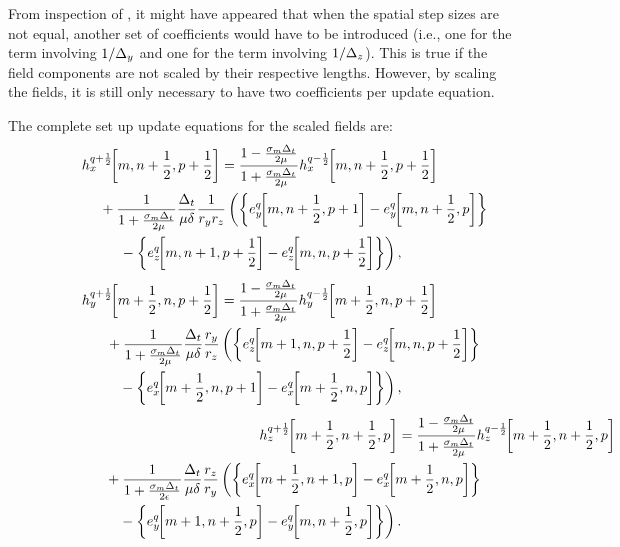 From inspection of , it might have appeared
that when the spatial step sizes are not equal, another set of
coefficients would have to be introduced (i.e., one for the term
involving $1/\Delta_y$ and one for the term involving $1/\Delta_z$).  This
is true if the field components are not scaled by their respective
lengths.  However, by scaling the fields, it is still only necessary
to have two coefficients per update equation.

The complete set up update equations for the scaled fields are:
\begin{multline}
  \fdtdh{h_x}{m,n+\half,p+\half}{q+\half} =
  \frac{1-\frac{\sigma_m\Delt}{2\mu}}{1+\frac{\sigma_m\Delt}{2\mu}}
  \fdtdh{h_x}{m,n+\half,p+\half}{q-\half} \\
  \hspace{.68in}\mbox{} +
  \frac{1}{1+\frac{\sigma_m\Delt}{2\mu}}
  \frac{\Delt}{\mu\delta}\frac{1}{r_y r_z}
  \left(
    \left\{
      \fdtdh{e_y}{m,n+\half,p+1}{q} -
      \fdtdh{e_y}{m,n+\half,p}{q}
     \right\}
  \right. \\
  \left. \mbox{} -
    \left\{
      \fdtdh{e_z}{m,n+1,p+\half}{q} -
      \fdtdh{e_z}{m,n,p+\half}{q}
    \right\}
  \right),
\end{multline}
\begin{multline}
  \fdtdh{h_y}{m+\half,n,p+\half}{q+\half} =
  \frac{1-\frac{\sigma_m\Delt}{2\mu}}{1+\frac{\sigma_m\Delt}{2\mu}}
  \fdtdh{h_y}{m+\half,n,p+\half}{q-\half} \\
  \hspace{.68in}\mbox{} + 
  \frac{1}{1+\frac{\sigma_m\Delt}{2\mu}}
  \frac{\Delt}{\mu\delta}\frac{r_y}{r_z}
  \left(
    \left\{
      \fdtdh{e_z}{m+1,n,p+\half}{q} -
      \fdtdh{e_z}{m,n,p+\half}{q}
    \right\}
  \right.\\
  \left.\mbox{} -
    \left\{
      \fdtdh{e_x}{m+\half,n,p+1}{q} -
      \fdtdh{e_x}{m+\half,n,p}{q}
    \right\}
  \right),
\end{multline}
\begin{multline}
  \lefteqn{\fdtdh{h_z}{m+\half,n+\half,p}{q+\half} =
  \frac{1-\frac{\sigma_m\Delt}{2\mu}}{1+\frac{\sigma_m\Delt}{2\mu}}
  \fdtdh{h_z}{m+\half,n+\half,p}{q-\half}}
  \\
  \hspace{.68in}\mbox{} +
  \frac{1}{1+\frac{\sigma_m\Delt}{2\epsilon}}
  \frac{\Delt}{\mu\delta}\frac{r_z}{r_y}
  \left(
    \left\{
      \fdtdh{e_x}{m+\half,n+1,p}{q} - 
      \fdtdh{e_x}{m+\half,n,p}{q}
    \right\} 
  \right. \\
  \left. \mbox{} -
    \left\{
      \fdtdh{e_y}{m+1,n+\half,p}{q} - 
      \fdtdh{e_y}{m,n+\half,p}{q}
    \right\}
  \right).
\end{multline}
